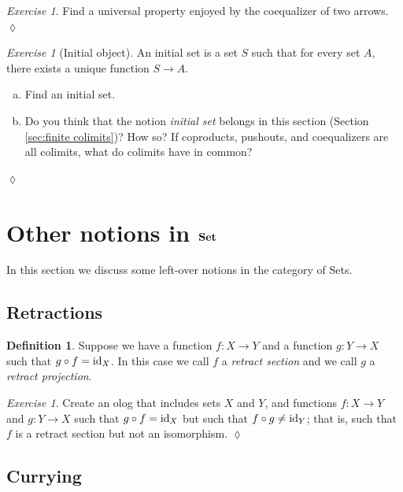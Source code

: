 \documentclass{book}
\def\tn{\textnormal}
\def\to{\rightarrow}
\def\taking{\colon}
\def\id{\tn{id}}
\def\Set{{\bf Set}}
\theoremstyle{remark}
\newtheorem{exc}[subsubsection]{Exercise}
\newenvironment{exercise}{\begin{exc}}{\hspace*{\fill}$\lozenge$\end{exc}}
\theoremstyle{definition}
\newtheorem{definition}[subsubsection]{Definition}
\def\sexc{\begin{enumerate}[a.)]\setlength{\itemsep}{.1cm}\setlength{\parskip}{.1cm}\item}
\def\next{\item}
\def\endsexc{\end{enumerate}}
\begin{document}
\begin{exercise}
Find a universal property enjoyed by the coequalizer of two arrows.
\end{exercise}

\begin{exercise}[Initial object]\label{exc:initial set}
An initial set is a set $S$ such that for every set $A$, there exists a unique function $S\to A$. 
\sexc Find an initial set. 
\next Do you think that the notion {\em initial set} belongs in this section (Section \ref{sec:finite colimits})? How so? If coproducts, pushouts, and coequalizers are all colimits, what do colimits have in common?
\endsexc
\end{exercise}


\section{Other notions in $\Set$}

In this section we discuss some left-over notions in the category of Sets.


\subsection{Retractions}

\begin{definition}

Suppose we have a function $f\taking X\to Y$ and a function $g\taking Y\to X$ such that $g\circ f=\id_X$. In this case we call $f$ a {\em retract section} and we call $g$ a {\em retract projection}. 

\end{definition}

\begin{exercise}
Create an olog that includes sets $X$ and $Y$, and functions $f\taking X\to Y$ and $g\taking Y\to X$ such that $g\circ f=\id_X$ but such that $f\circ g\neq\id_Y$; that is, such that $f$ is a retract section but not an isomorphism.
\end{exercise}


\subsection{Currying}\label{sec:currying}
\end{document}
